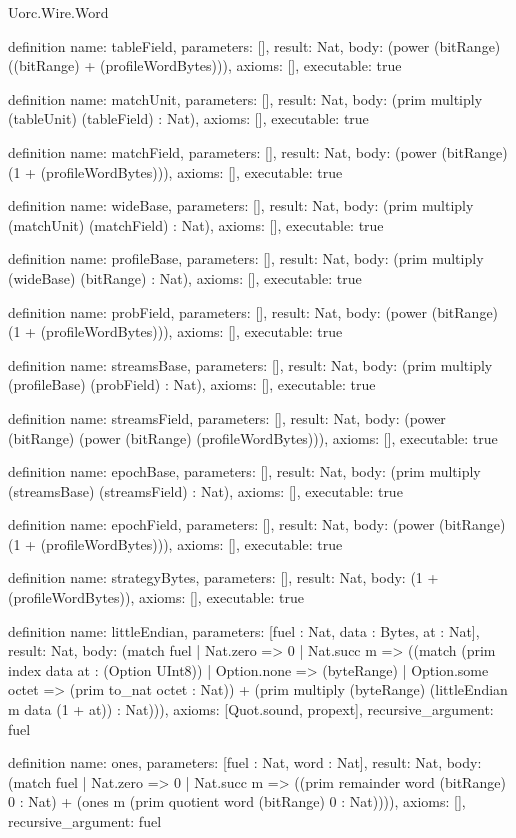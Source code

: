 \begin{lexlean}{Uorc.Wire.Word}
\begin{semanticmodule}
definition{
  name: tableField,
  parameters: [],
  result: Nat,
  body: (power (bitRange) ((bitRange) + (profileWordBytes))),
  axioms: [],
  executable: true
}

definition{
  name: matchUnit,
  parameters: [],
  result: Nat,
  body: (prim multiply (tableUnit) (tableField) : Nat),
  axioms: [],
  executable: true
}

definition{
  name: matchField,
  parameters: [],
  result: Nat,
  body: (power (bitRange) (1 + (profileWordBytes))),
  axioms: [],
  executable: true
}

definition{
  name: wideBase,
  parameters: [],
  result: Nat,
  body: (prim multiply (matchUnit) (matchField) : Nat),
  axioms: [],
  executable: true
}

definition{
  name: profileBase,
  parameters: [],
  result: Nat,
  body: (prim multiply (wideBase) (bitRange) : Nat),
  axioms: [],
  executable: true
}

definition{
  name: probField,
  parameters: [],
  result: Nat,
  body: (power (bitRange) (1 + (profileWordBytes))),
  axioms: [],
  executable: true
}

definition{
  name: streamsBase,
  parameters: [],
  result: Nat,
  body: (prim multiply (profileBase) (probField) : Nat),
  axioms: [],
  executable: true
}

definition{
  name: streamsField,
  parameters: [],
  result: Nat,
  body: (power (bitRange) (power (bitRange) (profileWordBytes))),
  axioms: [],
  executable: true
}

definition{
  name: epochBase,
  parameters: [],
  result: Nat,
  body: (prim multiply (streamsBase) (streamsField) : Nat),
  axioms: [],
  executable: true
}

definition{
  name: epochField,
  parameters: [],
  result: Nat,
  body: (power (bitRange) (1 + (profileWordBytes))),
  axioms: [],
  executable: true
}

definition{
  name: strategyBytes,
  parameters: [],
  result: Nat,
  body: (1 + (profileWordBytes)),
  axioms: [],
  executable: true
}

definition{
  name: littleEndian,
  parameters: [fuel : Nat, data : Bytes, at : Nat],
  result: Nat,
  body: (match fuel
    | Nat.zero => 0
    | Nat.succ m => ((match (prim index data at : (Option UInt8))
      | Option.none => (byteRange)
      | Option.some octet => (prim to_nat octet : Nat)) + (prim multiply (byteRange) (littleEndian m data (1 + at)) : Nat))),
  axioms: [Quot.sound, propext],
  recursive_argument: fuel
}

definition{
  name: ones,
  parameters: [fuel : Nat, word : Nat],
  result: Nat,
  body: (match fuel
    | Nat.zero => 0
    | Nat.succ m => ((prim remainder word (bitRange) 0 : Nat) + (ones m (prim quotient word (bitRange) 0 : Nat)))),
  axioms: [],
  recursive_argument: fuel
}
\end{semanticmodule}
\end{lexlean}
